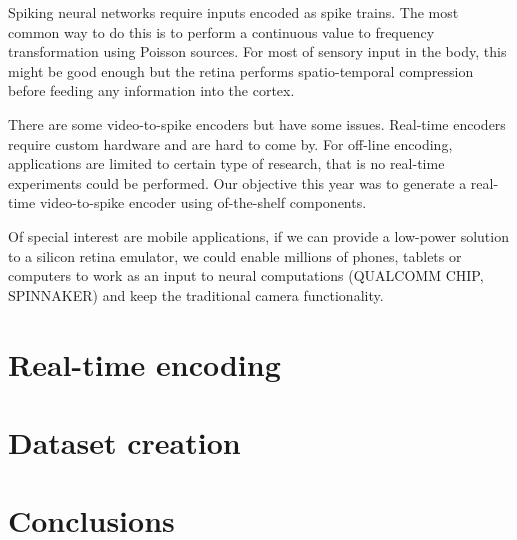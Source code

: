 Spiking neural networks require inputs encoded as spike trains. The most common way to do this is to perform a continuous value to frequency transformation using Poisson sources. For most of sensory input in the body, this might be good enough but the retina performs spatio-temporal compression before feeding any information into the cortex.

There are some video-to-spike encoders but have some issues. Real-time encoders require custom hardware and are hard to come by. For off-line encoding, applications are limited to certain type of research, that is no real-time experiments could be performed. Our objective this year was to generate a real-time video-to-spike encoder using of-the-shelf components. 

Of special interest are mobile applications, if we can provide a low-power solution to a silicon retina emulator, we could enable millions of phones, tablets or computers to work as an input to neural computations (QUALCOMM CHIP, SPINNAKER) and keep the traditional camera functionality.

\section{Real-time encoding}

%

\section{Dataset creation}

\section{Conclusions}
